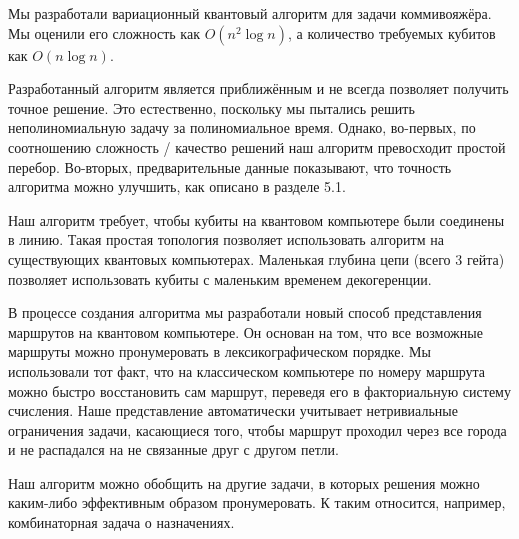
Мы разработали вариационный квантовый алгоритм для задачи коммивояжёра. Мы оценили его сложность как $O(n^2 \log n)$, а количество требуемых кубитов как $O(n \log n)$.

Разработанный алгоритм является приближённым и не всегда позволяет получить точное решение. 
Это естественно, поскольку мы пытались решить неполиномиальную задачу за полиномиальное время. 
Однако, во-первых, по соотношению сложность / качество решений наш алгоритм превосходит простой перебор. 
Во-вторых, предварительные данные показывают, что точность алгоритма можно улучшить, как описано в разделе 5.1.

Наш алгоритм требует, чтобы кубиты на квантовом компьютере были соединены в линию. Такая простая топология позволяет использовать алгоритм на существующих квантовых компьютерах. Маленькая глубина цепи (всего 3 гейта) позволяет использовать кубиты с маленьким временем декогеренции. 

В процессе создания алгоритма мы разработали новый способ представления маршрутов на квантовом компьютере.
Он основан на том, что все возможные маршруты можно пронумеровать в лексикографическом порядке.
Мы использовали тот факт, что на классическом компьютере по номеру маршрута можно быстро восстановить сам маршрут, переведя его в факториальную систему счисления.
Наше представление автоматически учитывает нетривиальные ограничения задачи, касающиеся того, чтобы маршрут проходил через все города и не распадался на не связанные друг с другом петли.

Наш алгоритм можно обобщить на другие задачи, в которых решения можно каким-либо эффективным образом пронумеровать. К таким относится, например, комбинаторная задача о назначениях.








\sloppy
\showbib


 
